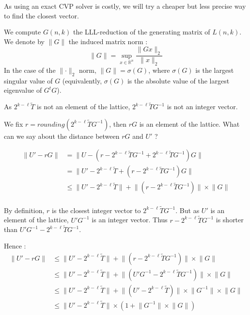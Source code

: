 \documentclass[preprint,svgnames]{iacrtrans}
\begin{document}
As using an exact CVP solver is costly, we will try a cheaper but less precise way to find the closest vector.

We compute \(G(n,k)\) the LLL-reduction of the generating matrix of \(L(n,k)\). We denote by  \(\rVert G \lVert\) the induced matrix norm :
\[\rVert G \lVert =  \sup_{x \in \mathbb{R}^n}\frac{\lVert Gx \rVert_2}{\lVert x \rVert_2}\]
In the case of the \(\lVert \cdot \rVert_2\) norm,
\(\rVert G \lVert = \sigma(G)\), where \(\sigma(G)\) is the largest singular
value of $G$ (equivalently, $\sigma(G)$ is the absolute value of the largest
eigenvalue of $G^{t} G$).


As \(2^{k-\ell}\widetilde{T}\) is not an element of the lattice, \(2^{k-\ell}\widetilde{T}G^{-1}\) is not an integer vector.

We fix \(r = rounding(2^{k-\ell}\widetilde{T}G^{-1}) \), then \(rG\) is an element of the lattice. What can we say about the distance between \(rG\) and \(U'\) ?

\begin{align*}
\lVert U' - rG \rVert &= \lVert U - (r-2^{k-\ell}\widetilde{T}G^{-1} + 2^{k-\ell}\widetilde{T}G^{-1})G \rVert\\
&= \lVert U' - 2^{k-\ell}\widetilde{T} + (r-2^{k-\ell}\widetilde{T}G^{-1})G \rVert\\
&\leqslant \lVert U' - 2^{k-\ell}\widetilde{T} \rVert + \lVert(r-2^{k-\ell}\widetilde{T}G^{-1})\rVert \times \lVert G\rVert\\	
\end{align*}

By definition, \(r\) is the closest integer vector to \(2^{k-\ell}\widetilde{T}G^{-1}\). But as \(U'\) is an element of the lattice, \(U'G^{-1}\) is an integer vector. Thus \(r-2^{k-\ell}\widetilde{T}G^{-1}\) is shorter than \(U'G^{-1}-2^{k-\ell}\widetilde{T}G^{-1}\).

Hence :
\begin{align*}
\lVert U' - rG \rVert &\leqslant \lVert U' - 2^{k-\ell}\widetilde{T} \rVert + \lVert(r-2^{k-\ell}\widetilde{T}G^{-1})\rVert \times \lVert G\rVert\\	
&\leqslant \lVert U' - 2^{k-\ell}\widetilde{T} \rVert + \lVert(U'G^{-1}-2^{k-\ell}\widetilde{T}G^{-1})\rVert \times \lVert G\rVert\\	
&\leqslant \lVert U' - 2^{k-\ell}\widetilde{T} \rVert + \lVert(U'-2^{k-\ell}\widetilde{T})\rVert \times \lVert G^{-1} \rVert  \times \lVert G\rVert\\
& 	\leqslant \lVert U' - 2^{k-\ell}\widetilde{T} \rVert \times (1 +\lVert G^{-1} \rVert  \times \lVert G\rVert )\\
\end{align*}
\end{document}
